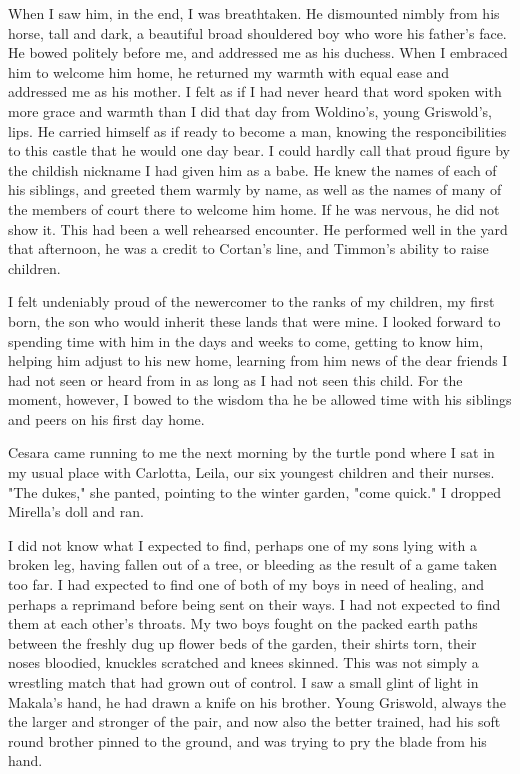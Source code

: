 \documentclass{article}
\begin{document}
When I saw him, in the end, I was breathtaken. He dismounted nimbly from his horse, tall and dark, a beautiful broad shouldered boy who wore his father's face. He bowed politely before me, and addressed me as his duchess. When I embraced him to welcome him home, he returned my warmth with equal ease and addressed me as his mother. I felt as if I had never heard that word spoken with more grace and warmth than I did that day from Woldino's, young Griswold's, lips. He carried himself as if ready to become a man, knowing the responcibilities to this castle that he would one day bear. I could hardly call that proud figure by the childish nickname I had given him as a babe. He knew the names of each of his siblings, and greeted them warmly by name, as well as the names of many of the members of court there to welcome him home. If he was nervous, he did not show it. This had been a well rehearsed encounter. He performed well in the yard that afternoon, he was a credit to Cortan's line, and Timmon's ability to raise children. 

I felt undeniably proud of the newercomer to the ranks of my children, my first born, the son who would inherit these lands that were mine. I looked forward to spending time with him in the days and weeks to come, getting to know him, helping him adjust to his new home, learning from him news of the dear friends I had not seen or heard from in as long as I had not seen this child. For the moment, however, I bowed to the wisdom tha he be allowed time with his siblings and peers on his first day home.

Cesara came running to me the next morning by the turtle pond where I sat in my usual place with Carlotta, Leila, our six youngest children and their nurses. "The dukes," she panted, pointing to the winter garden, "come quick." I dropped Mirella's doll and ran. 

I did not know what I expected to find, perhaps one of my sons lying with a broken leg, having fallen out of a tree, or bleeding as the result of a game taken too far. I had expected to find one of both of my boys in need of healing, and perhaps a reprimand before being sent on their ways. I had not expected to find them at each other's throats. My two boys fought on the packed earth paths between the freshly dug up flower beds of the garden, their shirts torn, their noses bloodied, knuckles scratched and knees skinned. This was not simply a wrestling match that had grown out of control. I saw a small glint of light in Makala's hand, he had drawn a knife on his brother. Young Griswold, always the the larger and stronger of the pair, and now also the better trained, had his soft round brother pinned to the ground, and was trying to pry the blade from his hand. 
\end{document}
